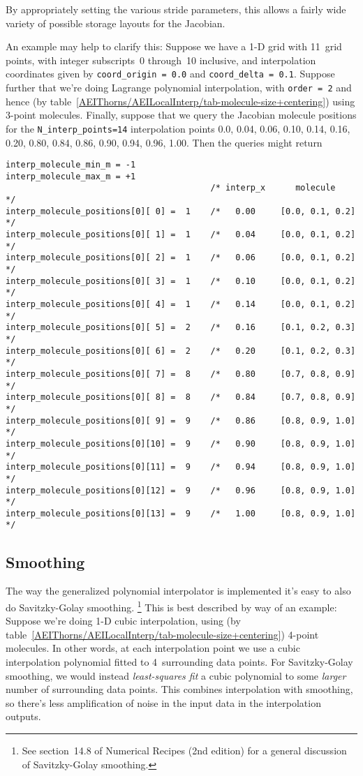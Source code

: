 By appropriately setting the various stride parameters, this allows
a fairly wide variety of possible storage layouts for the Jacobian.

An example may help to clarify this:  Suppose we have a 1-D grid
with 11~grid points, with integer subscripts~0 through~10 inclusive,
and interpolation coordinates given by \verb|coord_origin = 0.0|
and \verb|coord_delta = 0.1|.
Suppose further that we're doing Lagrange polynomial interpolation,
with \verb|order = 2| and hence
(by table~\ref{AEIThorns/AEILocalInterp/tab-molecule-size+centering})
using 3-point molecules.
Finally, suppose that we query the Jacobian molecule positions for
the \verb|N_interp_points=14| interpolation points 0.0, 0.04, 0.06,
0.10, 0.14, 0.16, 0.20, 0.80, 0.84, 0.86, 0.90, 0.94, 0.96, 1.00.
Then the queries might return
\begin{verbatim}
interp_molecule_min_m = -1
interp_molecule_max_m = +1
                                         /* interp_x      molecule     */
interp_molecule_positions[0][ 0] =  1    /*   0.00     [0.0, 0.1, 0.2] */
interp_molecule_positions[0][ 1] =  1    /*   0.04     [0.0, 0.1, 0.2] */
interp_molecule_positions[0][ 2] =  1    /*   0.06     [0.0, 0.1, 0.2] */
interp_molecule_positions[0][ 3] =  1    /*   0.10     [0.0, 0.1, 0.2] */
interp_molecule_positions[0][ 4] =  1    /*   0.14     [0.0, 0.1, 0.2] */
interp_molecule_positions[0][ 5] =  2    /*   0.16     [0.1, 0.2, 0.3] */
interp_molecule_positions[0][ 6] =  2    /*   0.20     [0.1, 0.2, 0.3] */
interp_molecule_positions[0][ 7] =  8    /*   0.80     [0.7, 0.8, 0.9] */
interp_molecule_positions[0][ 8] =  8    /*   0.84     [0.7, 0.8, 0.9] */
interp_molecule_positions[0][ 9] =  9    /*   0.86     [0.8, 0.9, 1.0] */
interp_molecule_positions[0][10] =  9    /*   0.90     [0.8, 0.9, 1.0] */
interp_molecule_positions[0][11] =  9    /*   0.94     [0.8, 0.9, 1.0] */
interp_molecule_positions[0][12] =  9    /*   0.96     [0.8, 0.9, 1.0] */
interp_molecule_positions[0][13] =  9    /*   1.00     [0.8, 0.9, 1.0] */
\end{verbatim}


\subsection{Smoothing}

The way the generalized polynomial interpolator is implemented it's
easy to also do Savitzky-Golay smoothing.%
\footnote{%
	 See section~14.8 of Numerical Recipes
	 (2nd edition) for a general discussion of
	 Savitzky-Golay smoothing.
	 }%
{}  This is best described by way of an example:  Suppose we're doing
1-D cubic interpolation, using
(by table~\ref{AEIThorns/AEILocalInterp/tab-molecule-size+centering})
4-point molecules.  In other words, at each interpolation point we
use a cubic interpolation polynomial fitted to 4~surrounding data points.
For Savitzky-Golay smoothing, we would instead {\em least-squares fit\/}
a cubic polynomial to some {\em larger\/} number of surrounding data
points.  This combines interpolation with smoothing, so there's less
amplification of noise in the input data in the interpolation outputs.

